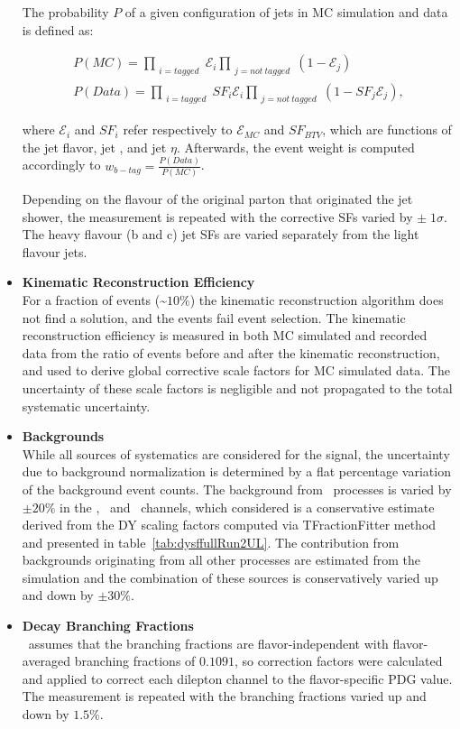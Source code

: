 \begin{itemize}
    The probability $P$ of a given configuration of jets in MC simulation and data is defined as:
    \begin{linenomath*}
    \begin{align}
    P(MC) = \prod_{\substack{i=tagged}} \mathcal{E}_i \prod_{\substack{j=not~tagged}} (1 - \mathcal{E}_j) \\
    P(Data) = \prod_{\substack{i=tagged}} SF_i\mathcal{E}_i \prod_{\substack{j=not~tagged}} (1 - SF_j\mathcal{E}_j),
    \end{align}
    \end{linenomath*}
    where $\mathcal{E}_i$ and $ SF_i $ refer respectively to $\mathcal{E}_{MC}$ and $SF_{BTV}$, which are functions of the jet flavor, jet \pT, and jet $\eta$. 
    Afterwards, the event weight is computed accordingly to $w_{b-tag} = \frac{P(Data)}{P(MC)}$.
    
    Depending on the flavour of the original parton that originated the jet shower, the measurement is repeated with the corrective SFs varied by $\pm \; 1 \sigma$.
    The heavy flavour (b and c) jet SFs are varied separately from the light flavour jets.
    \item {\bf Kinematic Reconstruction Efficiency} \\
    For a fraction of events (\sim$10 \%$) the kinematic reconstruction algorithm does not find a solution, and the events fail event selection.
    The kinematic reconstruction efficiency is measured in both MC simulated and recorded data from the ratio of events before and after the kinematic reconstruction, and used to derive global corrective scale factors for MC simulated data.
    The uncertainty of these scale factors is negligible and not propagated to the total systematic uncertainty.
    \item {\bf Backgrounds} \\
    While all sources of systematics are considered for the signal, the uncertainty due to background normalization is determined by a flat percentage variation of the background event counts.
    The background from \zjets\ processes is varied by $\pm 20\%$ in the \ee, \emu\ and \mumu\ channels, which considered is a conservative estimate derived from the DY scaling factors computed via TFractionFitter method and presented in table~\ref{tab:dysffullRun2UL}. 
    The contribution from backgrounds originating from all other processes are estimated from the simulation and the combination of these sources is conservatively varied up and down by $\pm 30\%$.
    \item {\bf Decay Branching Fractions} \\
    \Powheg\ assumes that the \ttbar branching fractions are flavor-independent with flavor-averaged branching fractions of $0.1091$, so correction factors were calculated and applied to correct each dilepton channel to the flavor-specific PDG value.
    The measurement is repeated with the branching fractions varied up and down by $1.5 \%$.
\end{itemize}

